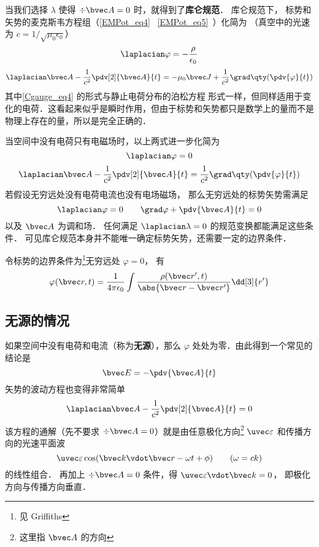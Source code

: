 

当我们选择 $\lambda$ 使得 $\div \bvec A = 0$ 时，就得到了\textbf{库仑规范}． 库仑规范下， 标势和矢势的麦克斯韦方程组（\autoref{EMPot_eq4}~ \autoref{EMPot_eq5}~）化简为 （真空中的光速为 $c = 1/\sqrt{\mu_0\epsilon_0}$）%
\begin{equation}\label{Cgauge_eq4}
\laplacian \varphi = -\frac{\rho}{\epsilon_0}
\end{equation}
\begin{equation}
\laplacian \bvec A - \frac{1}{c^2} \pdv[2]{\bvec A}{t} = -\mu_0\bvec J + \frac{1}{c^2} \grad\qty(\pdv{\varphi}{t})
\end{equation}
其中\autoref{Cgauge_eq4} 的形式与静止电荷分布的泊松方程%
形式一样，但同样适用于变化的电荷．这看起来似乎是瞬时作用，但由于标势和矢势都只是数学上的量而不是物理上存在的量，所以是完全正确的．

当空间中没有电荷只有电磁场时，以上两式进一步化简为
\begin{equation}
\laplacian \varphi = 0
\end{equation}
\begin{equation}
\laplacian \bvec A - \frac{1}{c^2}\pdv[2]{\bvec A}{t} = \frac{1}{c^2} \grad\qty(\pdv{\varphi}{t})
\end{equation}
若假设无穷远处没有电荷电流也没有电场磁场， 那么无穷远处的标势矢势需满足
\begin{equation}
\laplacian \varphi = 0 \qquad
\grad \varphi + \pdv{\bvec A}{t} = 0
\end{equation}
以及 $\bvec A$ 为调和场． 任何满足 $\laplacian \lambda = 0$ 的规范变换都能满足这些条件． 可见库仑规范本身并不能唯一确定标势矢势，还需要一定的边界条件．

令标势的边界条件为\footnote{见 Griffiths}无穷远处 $\varphi = 0$， 有
\begin{equation}
\varphi(\bvec r, t) = \frac{1}{4\pi\epsilon_0} \int \frac{\rho(\bvec r', t)}{\abs{\bvec r - \bvec r'}} \dd[3]{r'}
\end{equation}

\subsection{无源的情况}

如果空间中没有电荷和电流（称为\textbf{无源}），那么 $\varphi$ 处处为零．由此得到一个常见的结论是
\begin{equation}
\bvec E = - \pdv{\bvec A}{t}
\end{equation}
矢势的波动方程也变得非常简单
\begin{equation}
\laplacian \bvec A - \frac{1}{c^2} \pdv[2]{\bvec A}{t} = 0
\end{equation}
该方程的通解（先不要求 $\div \bvec A = 0$）就是由任意极化方向\footnote{这里指 $\bvec A$ 的方向} $\uvec \varepsilon$ 和传播方向的光速平面波
\begin{equation}
\uvec \varepsilon \cos(\bvec k \vdot \bvec r - \omega t + \phi) \qquad (\omega = ck)
\end{equation}
的线性组合． 再加上 $\div \bvec A = 0$ 条件，得 $\uvec \varepsilon \vdot \bvec k = 0$， 即极化方向与传播方向垂直．
